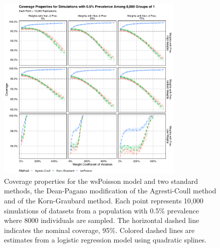 \begin{figure}
\centering
\includegraphics[width=0.8\textwidth]{perfect_coverage_8000_groups_0_005_prev}
\caption{Coverage properties for the wsPoisson model and two standard methods, the Dean-Pagano modification of the Agresti-Coull method and of the Korn-Graubard method.
Each point represents 10,000 simulations of datasets from a population with 0.5\% prevalence where 8000 individuals are sampled.
The horizontal dashed line indicates the nominal coverage, 95\%.
Colored dashed lines are estimates from a logistic regression model using quadratic splines.}
\label{ch_3:fig:perfect_coverage_8000_groups_0_005_prev}
\end{figure}

